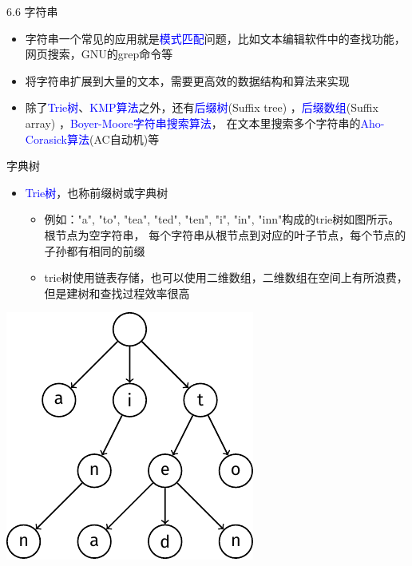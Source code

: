 \begin{frame}{6.6 字符串}
    \begin{itemize}
        \item 字符串一个常见的应用就是\textcolor{blue}{模式匹配}问题，比如文本编辑软件中的查找功能，网页搜索，GNU的grep命令等
        \vfill
        \item 将字符串扩展到大量的文本，需要更高效的数据结构和算法来实现
        \vfill
        \item 除了\textcolor{blue}{Trie树}、\textcolor{blue}{KMP算法}之外，还有\textcolor{blue}{后缀树}(Suffix tree) ，\textcolor{blue}{后缀数组}(Suffix array) ，\textcolor{blue}{Boyer-Moore字符串搜索算法}， 在文本里搜索多个字符串的\textcolor{blue}{Aho-Corasick算法}(AC自动机)等
    \end{itemize}
\end{frame}
\begin{frame}{字典树}
    \begin{itemize}
        \item \textcolor{blue}{Trie树}，也称前缀树或字典树
        \begin{itemize}
            \item 例如："a", "to", "tea", "ted", "ten", "i", "in", "inn"构成的trie树如图所示。根节点为空字符串， 每个字符串从根节点到对应的叶子节点，每个节点的子孙都有相同的前缀
            \item trie树使用链表存储，也可以使用二维数组，二维数组在空间上有所浪费，但是建树和查找过程效率很高
        \end{itemize}
    \end{itemize}    
    \includegraphics[scale=.8,center]{fig/6-7.pdf} 
\end{frame}
